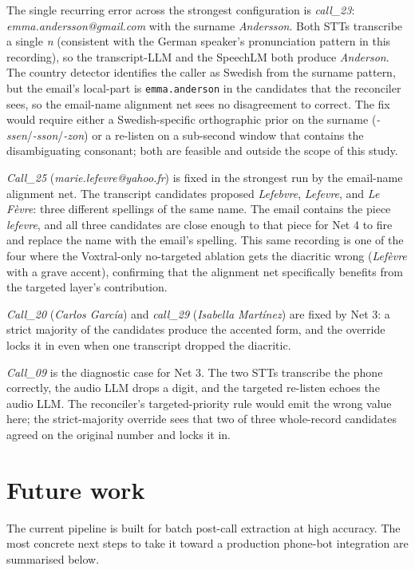 \documentclass[11pt,a4paper]{article}
\begin{document}
The single recurring error across the strongest configuration is
\textit{call\_23}: \textit{emma.andersson@gmail.com} with the surname
\textit{Andersson}. Both STTs transcribe a single \textit{n}
(consistent with the German speaker's pronunciation pattern in this
recording), so the transcript-LLM and the SpeechLM both produce
\textit{Anderson}. The country detector identifies the caller as
Swedish from the surname pattern, but the email's local-part is
\verb|emma.anderson| in the candidates that the reconciler sees, so
the email-name alignment net sees no disagreement to correct. The fix
would require either a Swedish-specific orthographic prior on the
surname (\textit{-ssen}/\textit{-sson}/\textit{-zon}) or a re-listen on
a sub-second window that contains the disambiguating consonant; both
are feasible and outside the scope of this study.

\textit{Call\_25} (\textit{marie.lefevre@yahoo.fr}) is fixed in the
strongest run by the email-name alignment net. The transcript
candidates proposed \textit{Lefebvre}, \textit{Lefevre}, and
\textit{Le F\`evre}: three different spellings of the same name.
The email contains the piece \textit{lefevre}, and all three
candidates are close enough to that piece for Net 4 to fire and
replace the name with the email's spelling. This same recording is
one of the four where the Voxtral-only no-targeted ablation gets
the diacritic wrong (\textit{Lef\`evre} with a grave accent),
confirming that the alignment net specifically benefits from the
targeted layer's contribution.

\textit{Call\_20} (\textit{Carlos Garc\'ia}) and \textit{call\_29}
(\textit{Isabella Mart\'inez}) are fixed by Net 3: a strict majority
of the candidates produce the accented form, and the override locks
it in even when one transcript dropped the diacritic.

\textit{Call\_09} is the diagnostic case for Net 3. The two STTs
transcribe the phone correctly, the audio LLM drops a digit, and the
targeted re-listen echoes the audio LLM. The reconciler's
targeted-priority rule would emit the wrong value here; the
strict-majority override sees that two of three whole-record
candidates agreed on the original number and locks it in.

\section{Future work}\label{sec:future}

The current pipeline is built for batch post-call extraction at
high accuracy. The most concrete next steps to take it toward a
production phone-bot integration are summarised below.
\end{document}

